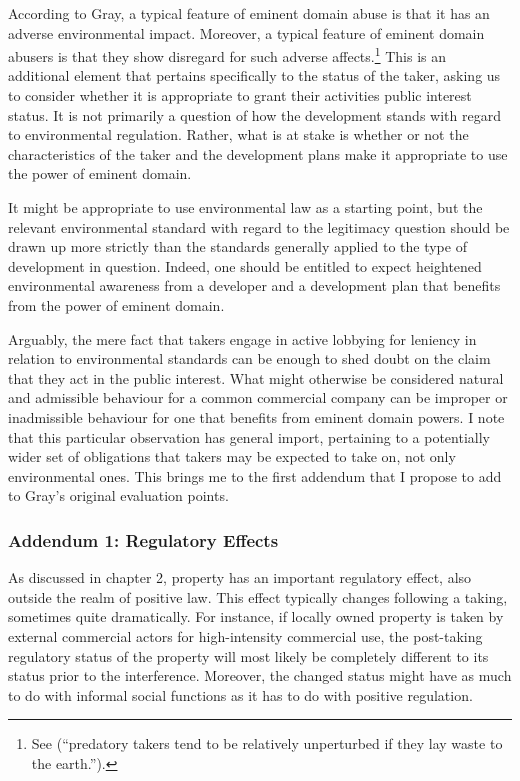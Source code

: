 According to Gray, a typical feature of eminent domain abuse is that it has an adverse environmental impact. Moreover, a typical feature of eminent domain abusers is that they show disregard for such adverse affects.\footnote{See \cite[34]{gray11} (``predatory takers tend to be relatively unperturbed if they lay waste to the earth.'').} This is an additional element that pertains specifically to the status of the taker, asking us to consider whether it is appropriate to grant their activities public interest status. It is not primarily a question of how the development stands with regard to environmental regulation. Rather, what is at stake is whether or not the characteristics of the taker and the development plans make it appropriate to use the power of eminent domain. 

It might be appropriate to use environmental law as a starting point, but the relevant environmental standard with regard to the legitimacy question should be drawn up more strictly than the standards generally applied to the type of development in question. Indeed, one should be entitled to expect heightened environmental awareness from a developer and a development plan that benefits from the power of eminent domain.

Arguably, the mere fact that takers engage in active lobbying for leniency in relation to environmental standards can be enough to shed doubt on the claim that they act in the public interest. What might otherwise be considered natural and admissible behaviour for a common commercial company can be improper or inadmissible behaviour for one that benefits from eminent domain powers. I note that this particular observation has general import, pertaining to a potentially wider set of obligations that takers may be expected to take on, not only environmental ones. This brings me to the first addendum  that I propose to add to Gray's original evaluation points.

\subsubsection*{Addendum 1: Regulatory Effects}

As discussed in chapter 2, property has an important regulatory effect, also outside the realm of positive law. This effect typically changes following a taking, sometimes quite dramatically.  For instance, if locally owned property is taken by external commercial actors for high-intensity commercial use, the post-taking regulatory status of the property will most likely be completely different to its status prior to the interference. Moreover, the changed status might have as much to do with informal social functions as it has to do with positive regulation.


